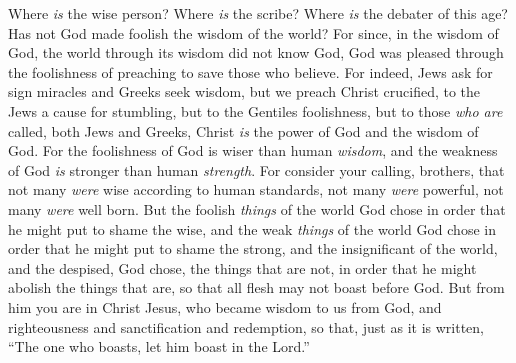 \begin{biblechapter}
\verse Where \textit{is} the wise person? Where \textit{is} the scribe? Where \textit{is} the debater of this age? Has not God made foolish the wisdom of the world?
\verse For since, in the wisdom of God, the world through its wisdom did not know God, God was pleased through the foolishness of preaching to save those who believe.
\verse For indeed, Jews ask for sign miracles and Greeks seek wisdom,
\verse but we preach Christ crucified, to the Jews a cause for stumbling, but to the Gentiles foolishness,
\verse but to those \textit{who are} called, both Jews and Greeks, Christ \textit{is} the power of God and the wisdom of God.
\verse For the foolishness of God is wiser than human \textit{wisdom}, and the weakness of God \textit{is} stronger than human \textit{strength}.
 For consider your calling, brothers, that not many \textit{were} wise according to human standards, not many \textit{were} powerful, not many \textit{were} well born.
\verse But the foolish \textit{things} of the world God chose in order that he might put to shame the wise, and the weak \textit{things} of the world God chose in order that he might put to shame the strong,
\verse and the insignificant of the world, and the despised, God chose, the things that are not, in order that he might abolish the things that are,
\verse so that all flesh may not boast before God.
\verse But from him you are in Christ Jesus, who became wisdom to us from God, and righteousness and sanctification and redemption,
\verse so that, just as it is written, “The one who boasts, let him boast in the Lord.”
\end{biblechapter}


